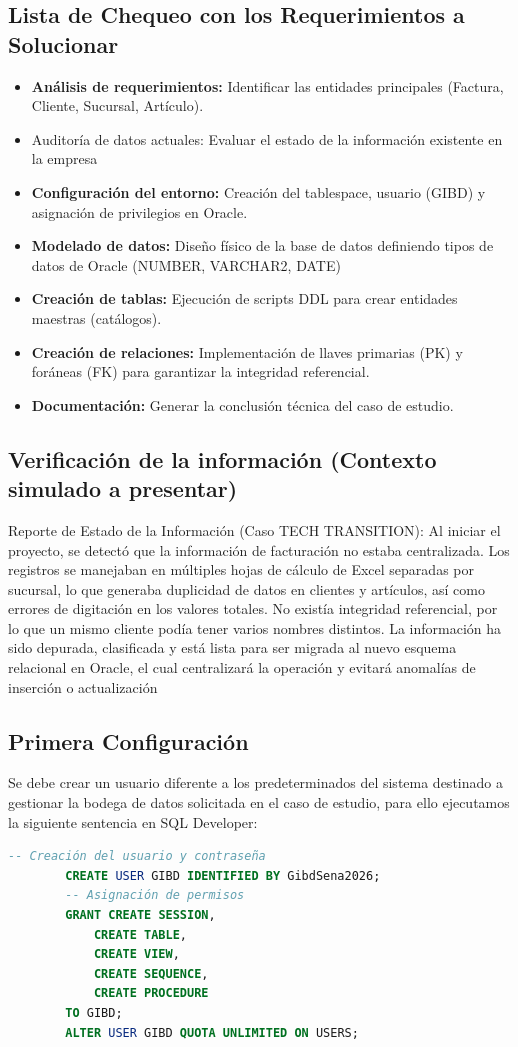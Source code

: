 	\subsection{Lista de Chequeo con los Requerimientos a Solucionar}
	\begin{itemize}
		\item \textbf{Análisis de requerimientos:} Identificar las entidades principales (Factura, Cliente, Sucursal, Artículo).
		\item Auditoría de datos actuales: Evaluar el estado de la información existente en la empresa
		\item \textbf{Configuración del entorno:} Creación del tablespace, usuario (GIBD) y asignación de privilegios en Oracle.
		\item \textbf{Modelado de datos:} Diseño físico de la base de datos definiendo tipos de datos de Oracle (NUMBER, VARCHAR2, DATE)
		\item \textbf{Creación de tablas:} Ejecución de scripts DDL para crear entidades maestras (catálogos).
		\item \textbf{Creación de relaciones:} Implementación de llaves primarias (PK) y foráneas (FK) para garantizar la integridad referencial.
		\item \textbf{Documentación:} Generar la conclusión técnica del caso de estudio.
	\end{itemize}
	
	\subsection{Verificación de la información (Contexto simulado a presentar)}
	Reporte de Estado de la Información (Caso TECH TRANSITION):
	Al iniciar el proyecto, se detectó que la información de facturación no estaba centralizada. Los registros se manejaban en múltiples hojas de cálculo de Excel separadas por sucursal, lo que generaba duplicidad de datos en clientes y artículos, así como errores de digitación en los valores totales. No existía integridad referencial, por lo que un mismo cliente podía tener varios nombres distintos. La información ha sido depurada, clasificada y está lista para ser migrada al nuevo esquema relacional en Oracle, el cual centralizará la operación y evitará anomalías de inserción o actualización

    \subsection{Primera Configuración}
    Se debe crear un usuario diferente a los predeterminados del sistema destinado a gestionar la bodega de datos solicitada en el caso de estudio, para ello ejecutamos la siguiente sentencia en SQL Developer:
    \begin{lstlisting}[language=sql, caption={Creación de Usuario de la Base de Datos}]	
    	-- Creación del usuario y contraseña
    	CREATE USER GIBD IDENTIFIED BY GibdSena2026;
    	-- Asignación de permisos
    	GRANT CREATE SESSION,
    		CREATE TABLE,
    		CREATE VIEW,
    		CREATE SEQUENCE,
    		CREATE PROCEDURE
    	TO GIBD;
    	ALTER USER GIBD QUOTA UNLIMITED ON USERS;
    \end{lstlisting}
    
